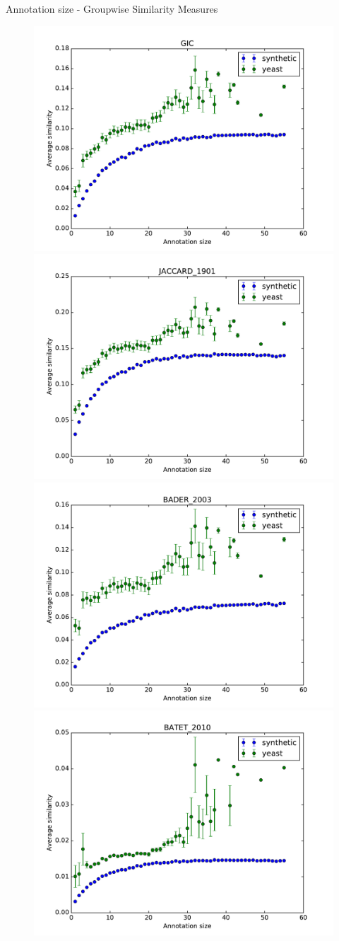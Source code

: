 \documentclass{beamer}
\begin{document}
\begin{frame}{Annotation size - Groupwise Similarity Measures}

\begin{figure}
\includegraphics[width=0.5\linewidth, height=0.4\textheight]{groupwise/SIM_GROUPWISE_DAG_GIC_avg.pdf}
\includegraphics[width=0.5\linewidth, height=0.4\textheight]{groupwise/SIM_FRAMEWORK_DAG_SET_JACCARD_1901_avg.pdf} \\
\includegraphics[width=0.5\linewidth, height=0.4\textheight]{groupwise/SIM_FRAMEWORK_DAG_SET_BADER_2003_avg.pdf}
\includegraphics[width=0.5\linewidth, height=0.4\textheight]{groupwise/SIM_FRAMEWORK_DAG_SET_BATET_2010_avg.pdf} \end{figure}

\end{frame}
\end{document}

